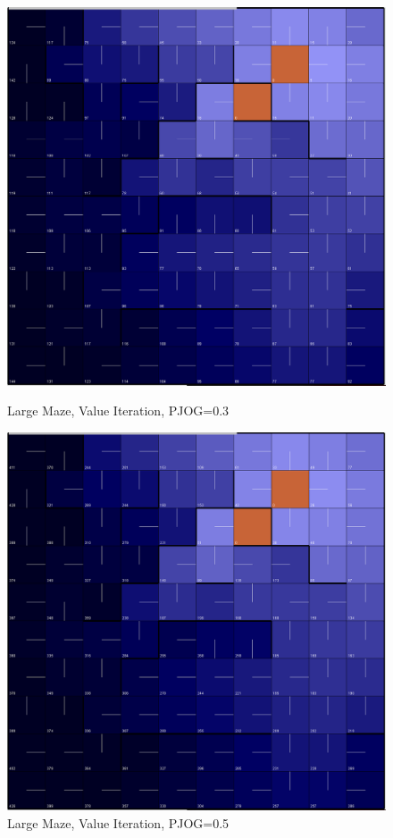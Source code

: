 \documentclass[11pt]{article}
\begin{document}
\begin{figure}[!htb]
   \begin{minipage}{0.4\textwidth}
     \centering
     \includegraphics[width=1.2\linewidth]{../figures/value2_3.png}
     \caption{Large Maze, Value Iteration, PJOG=0.3}\label{Fig:value2_3}
   \end{minipage}\hfill
   \begin{minipage}{0.4\textwidth}
     \centering
     \includegraphics[width=1.2\linewidth]{../figures/value2_5.png}
     \caption{Large Maze, Value Iteration, PJOG=0.5}\label{Fig:value2_5}
   \end{minipage}
\end{figure}
\end{document}
